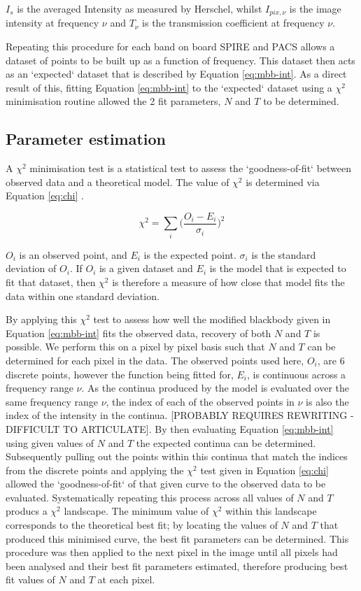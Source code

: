 \documentclass{report}
\begin{document}
$I_{s}$ is the averaged Intensity as measured by Herschel, whilst $I_{pix,\nu}$ is the image intensity at frequency $\nu$ and $T_{\nu}$ is the transmission coefficient at frequency $\nu$.

Repeating this procedure for each band on board SPIRE and PACS allows a dataset of points to be built up as a function of frequency. This dataset then acts as an `expected` dataset that is described by Equation \ref{eq:mbb-int}. As a direct result of this, fitting Equation \ref{eq:mbb-int} to the `expected` dataset using a $\chi^{2}$ minimisation routine allowed the 2 fit parameters, $N$ and $T$ to be determined.

\subsection{Parameter estimation}
A $\chi^{2}$ minimisation test is a statistical test to assess the `goodness-of-fit` between observed data and a theoretical model. The value of $\chi^{2}$ is determined via Equation \ref{eq:chi} \parencite{error}.

\begin{equation}
  \chi^{2} = \sum_{i}\Bigg (\frac{O_{i}-E_{i}}{\sigma_{i}} \Bigg )^{2}
   \label{eq:chi}
\end{equation}

$O_{i}$ is an observed point, and $E_{i}$ is the expected point. $\sigma_{i}$ is the standard deviation of $O_{i}$. If $O_{i}$ is a given dataset and $E_{i}$ is the model that is expected to fit that dataset, then $\chi^{2}$ is therefore a measure of how close that model fits the data within one standard deviation.

By applying this $\chi^{2}$ test to assess how well the modified blackbody given in Equation \ref{eq:mbb-int} fits the observed data, recovery of both $N$ and $T$ is possible. We perform this on a pixel by pixel basis such that $N$ and $T$ can be determined for each pixel in the data. The observed points used here, $O_{i}$, are 6 discrete points, however the function being fitted for, $E_{i}$, is continuous across a frequency range $\nu$. As the continua produced by the model is evaluated over the same frequency range $\nu$, the index of each of the observed points in $\nu$ is also the index of the intensity in the continua. [PROBABLY REQUIRES REWRITING - DIFFICULT TO ARTICULATE]. By then evaluating Equation \ref{eq:mbb-int} using given values of $N$ and $T$ the expected continua can be determined. Subsequently pulling out the points within this continua that match the indices from the discrete points and applying the
$\chi^{2}$ test given in Equation \ref{eq:chi} allowed the `goodness-of-fit` of that given curve to the observed data to be evaluated. Systematically repeating this process across all values of $N$ and $T$ producs a $\chi^{2}$ landscape. The minimum value of $\chi^{2}$ within this landscape corresponds to the theoretical best fit; by locating the values of $N$ and $T$ that produced this minimised curve, the best fit parameters can be determined. This procedure was then applied to the next pixel in the image until all pixels had been analysed and their best fit parameters estimated, therefore producing best fit values of $N$ and $T$ at each pixel.
\end{document}
